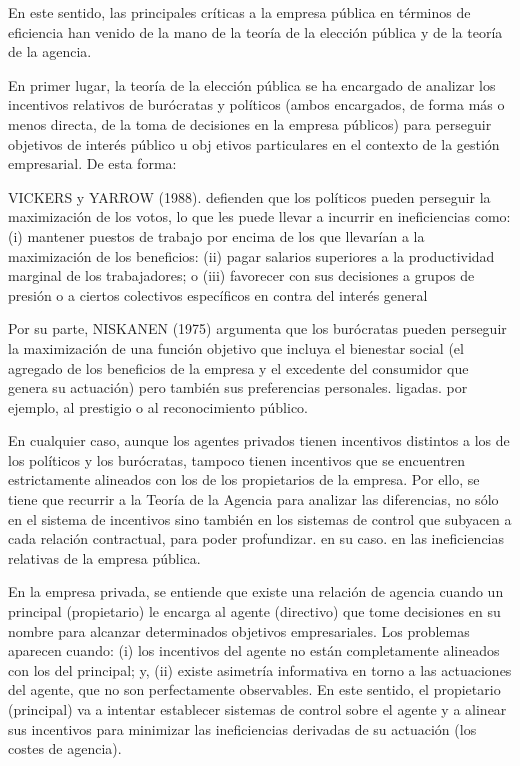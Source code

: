 \documentclass[10pt,a4paper]{article}
\begin{document}
En este sentido, las principales críticas a la empresa pública en términos de eficiencia han venido de la mano de la teoría de la elección pública y de la teoría de la agencia.

En primer lugar, la teoría de la elección pública se ha encargado de analizar los incentivos relativos de burócratas y políticos (ambos encargados, de forma más o menos directa, de la toma de decisiones en la empresa públicos) para perseguir objetivos de interés público u obj etivos particulares en el contexto de la gestión empresarial. De esta forma: 

VICKERS y YARROW (1988). defienden que los políticos pueden perseguir la maximización de los votos, lo que les puede llevar a incurrir en ineficiencias como: (i) mantener puestos de trabajo por encima de los que llevarían a la maximización de los beneficios: (ii) pagar salarios superiores a la productividad marginal de los trabajadores; o (iii) favorecer con sus decisiones a grupos de presión o a ciertos colectivos específicos en contra del interés general

Por su parte, NISKANEN (1975) argumenta que los burócratas pueden perseguir la maximización de una función objetivo que incluya el bienestar social (el agregado de los beneficios de la empresa y el excedente del consumidor que genera su actuación) pero también sus preferencias personales. ligadas. por ejemplo, al prestigio o al reconocimiento público.

En cualquier caso, aunque los agentes privados tienen incentivos distintos a los de los políticos y los burócratas, tampoco tienen incentivos que se encuentren estrictamente alineados con los de los propietarios de la empresa. Por ello, se tiene que recurrir a la Teoría de la Agencia para analizar las diferencias, no sólo en el sistema de incentivos sino también en los sistemas de control que subyacen a cada relación contractual, para poder profundizar. en su caso. en las ineficiencias relativas de la empresa pública.

En la empresa privada, se entiende que existe una relación de agencia cuando un principal (propietario) le encarga al agente (directivo) que tome decisiones en su nombre para alcanzar determinados objetivos empresariales. Los problemas aparecen cuando: (i) los incentivos del agente no están completamente alineados con los del principal; y, (ii) existe asimetría informativa en torno a las actuaciones del agente, que no son perfectamente observables. En este sentido, el propietario (principal) va a intentar establecer sistemas de control sobre el agente y a alinear sus incentivos para minimizar las ineficiencias derivadas de su actuación (los costes de agencia).
\end{document}
